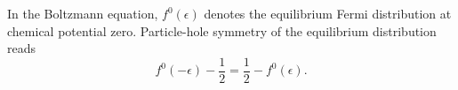 \documentclass{article}
\begin{document}
In the Boltzmann equation, $f^{0}(\epsilon)$ denotes the equilibrium Fermi distribution at chemical
potential zero. Particle-hole symmetry of the equilibrium distribution reads
\begin{equation}
f^{0}(-\epsilon) - \frac{1}{2} = \frac{1}{2} - f^{0}(\epsilon) .
\label{eq:ph}
\end{equation}
\end{document}
